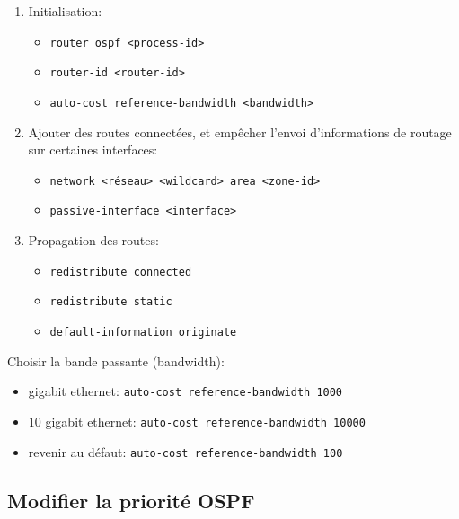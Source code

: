 \documentclass[a4paper]{article}
\begin{document}
\begin{enumerate}
    \item Initialisation:
    \begin{itemize}[label=\textbf{–}]
        \item \texttt{router ospf <process-id>}
        \item \texttt{router-id <router-id>}
        \item \texttt{auto-cost reference-bandwidth <bandwidth>}
    \end{itemize}
    \item Ajouter des routes connectées, et empêcher l’envoi d’informations de routage sur certaines interfaces:
    \begin{itemize}[label=\textbf{–}]
        \item \texttt{network <réseau> <wildcard> area <zone-id>}
        \item \texttt{passive-interface <interface>}
    \end{itemize}
    \item Propagation des routes:
    \begin{itemize}[label=\textbf{–}]
        \item \texttt{redistribute connected}
        \item \texttt{redistribute static}
        \item \texttt{default-information originate}
    \end{itemize}
\end{enumerate}
Choisir la bande passante (bandwidth):
\begin{itemize}
    \item gigabit ethernet: \texttt{auto-cost reference-bandwidth 1000}
    \item 10 gigabit ethernet: \texttt{auto-cost reference-bandwidth 10000}
    \item revenir au défaut: \texttt{auto-cost reference-bandwidth 100}
\end{itemize}










\subsection{Modifier la priorité OSPF}
\end{document}
